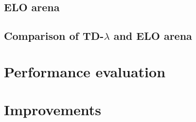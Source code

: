\documentclass[11pt,twocolumn]{article}
\newcommand{\tdl}{TD-$\lambda$ }
\begin{document}
\subsection{ELO arena}
\subsection{Comparison of \tdl and ELO arena}
\section{Performance evaluation}
\section{Improvements}




\end{document}
